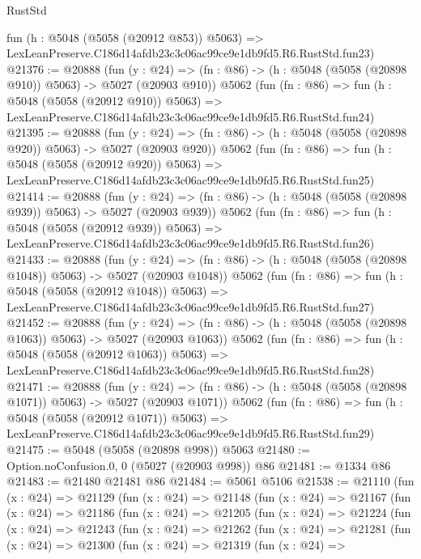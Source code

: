 \begin{lexlean}{RustStd}
\begin{coremodule}
    fun (h : @5048 (@5058 (@20912 @853)) @5063) =>
    LexLeanPreserve.C186d14afdb23c3c06ac99ce9e1db9fd5.R6.RustStd.fun23)
@21376 := @20888
    (fun (y : @24) => (fn : @86) -> (h : @5048 (@5058 (@20898 @910)) @5063) -> @5027 (@20903 @910))
    @5062
    (fun (fn : @86) =>
    fun (h : @5048 (@5058 (@20912 @910)) @5063) =>
    LexLeanPreserve.C186d14afdb23c3c06ac99ce9e1db9fd5.R6.RustStd.fun24)
@21395 := @20888
    (fun (y : @24) => (fn : @86) -> (h : @5048 (@5058 (@20898 @920)) @5063) -> @5027 (@20903 @920))
    @5062
    (fun (fn : @86) =>
    fun (h : @5048 (@5058 (@20912 @920)) @5063) =>
    LexLeanPreserve.C186d14afdb23c3c06ac99ce9e1db9fd5.R6.RustStd.fun25)
@21414 := @20888
    (fun (y : @24) => (fn : @86) -> (h : @5048 (@5058 (@20898 @939)) @5063) -> @5027 (@20903 @939))
    @5062
    (fun (fn : @86) =>
    fun (h : @5048 (@5058 (@20912 @939)) @5063) =>
    LexLeanPreserve.C186d14afdb23c3c06ac99ce9e1db9fd5.R6.RustStd.fun26)
@21433 := @20888
    (fun (y : @24) =>
    (fn : @86) -> (h : @5048 (@5058 (@20898 @1048)) @5063) -> @5027 (@20903 @1048))
    @5062
    (fun (fn : @86) =>
    fun (h : @5048 (@5058 (@20912 @1048)) @5063) =>
    LexLeanPreserve.C186d14afdb23c3c06ac99ce9e1db9fd5.R6.RustStd.fun27)
@21452 := @20888
    (fun (y : @24) =>
    (fn : @86) -> (h : @5048 (@5058 (@20898 @1063)) @5063) -> @5027 (@20903 @1063))
    @5062
    (fun (fn : @86) =>
    fun (h : @5048 (@5058 (@20912 @1063)) @5063) =>
    LexLeanPreserve.C186d14afdb23c3c06ac99ce9e1db9fd5.R6.RustStd.fun28)
@21471 := @20888
    (fun (y : @24) =>
    (fn : @86) -> (h : @5048 (@5058 (@20898 @1071)) @5063) -> @5027 (@20903 @1071))
    @5062
    (fun (fn : @86) =>
    fun (h : @5048 (@5058 (@20912 @1071)) @5063) =>
    LexLeanPreserve.C186d14afdb23c3c06ac99ce9e1db9fd5.R6.RustStd.fun29)
@21475 := @5048 (@5058 (@20898 @998)) @5063
@21480 := Option.noConfusion.{0, 0} (@5027 (@20903 @998)) @86
@21481 := @1334 @86
@21483 := @21480 @21481 @86
@21484 := @5061 @5106
@21538 := @21110
    (fun (x : @24) =>
    @21129
      (fun (x : @24) =>
      @21148
        (fun (x : @24) =>
        @21167
          (fun (x : @24) =>
          @21186
            (fun (x : @24) =>
            @21205
              (fun (x : @24) =>
              @21224
                (fun (x : @24) =>
                @21243
                  (fun (x : @24) =>
                  @21262
                    (fun (x : @24) =>
                    @21281
                      (fun (x : @24) =>
                      @21300
                        (fun (x : @24) =>
                        @21319
                          (fun (x : @24) =>

\end{coremodule}
\end{lexlean}
